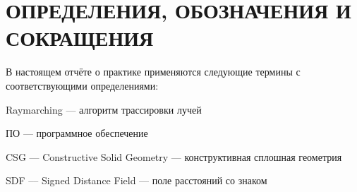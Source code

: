 \section*{ОПРЕДЕЛЕНИЯ, ОБОЗНАЧЕНИЯ И СОКРАЩЕНИЯ}
В настоящем отчёте о практике применяются следующие термины с соответствующими определениями:

Raymarching --- алгоритм трассировки лучей

ПО --- программное обеспечение

CSG --- Constructive Solid Geometry --- конструктивная сплошная геометрия

SDF –-- Signed Distance Field --- поле расстояний со знаком
\pagebreak